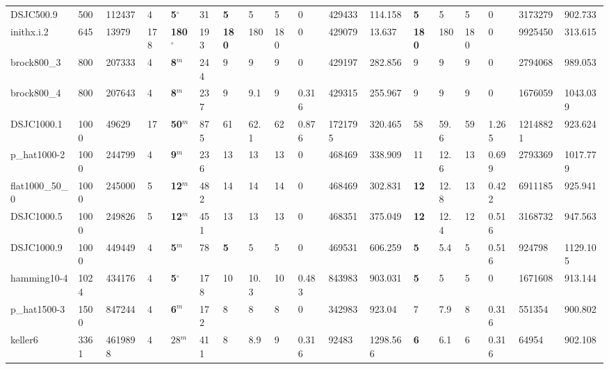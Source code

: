 \begin{table}[h!]
{\begin{tabular}{llllllllllllllllll}
            DSJC500.9 & 500 & 112437 & 4 & \textbf{5}$^{\circ}$ & 31 & \textbf{5} & 5 & 5 & 0 & 429433 & 114.158 & \textbf{5} & 5 & 5 & 0 & 3173279 & 902.733 \\
            inithx.i.2 & 645 & 13979 & 178 & \textbf{180}$^{\circ}$ & 193 & \textbf{180} & 180 & 180 & 0 & 429079 & 13.637 & \textbf{180} & 180 & 180 & 0 & 9925450 & 313.615 \\
            brock800\_3 & 800 & 207333 & 4 & \textbf{8}$^{m}$ & 244 & 9 & 9 & 9 & 0 & 429197 & 282.856 & 9 & 9 & 9 & 0 & 2794068 & 989.053 \\
            brock800\_4 & 800 & 207643 & 4 & \textbf{8}$^{m}$ & 237 & 9 & 9.1 & 9 & 0.316 & 429315 & 255.967 & 9 & 9 & 9 & 0 & 1676059 & 1043.039 \\
            DSJC1000.1 & 1000 & 49629 & 17 & \textbf{50}$^{m}$ & 875 & 61 & 62.1 & 62 & 0.876 & 1721795 & 320.465 & 58 & 59.6 & 59 & 1.265 & 12148821 & 923.624 \\
            p\_hat1000-2 & 1000 & 244799 & 4 & \textbf{9}$^{m}$ & 236 & 13 & 13 & 13 & 0 & 468469 & 338.909 & 11 & 12.6 & 13 & 0.699 & 2793369 & 1017.779 \\
            flat1000\_50\_0 & 1000 & 245000 & 5 & \textbf{12}$^{m}$ & 482 & 14 & 14 & 14 & 0 & 468469 & 302.831 & \textbf{12} & 12.8 & 13 & 0.422 & 6911185 & 925.941 \\
            DSJC1000.5 & 1000 & 249826 & 5 & \textbf{12}$^{m}$ & 451 & 13 & 13 & 13 & 0 & 468351 & 375.049 & \textbf{12} & 12.4 & 12 & 0.516 & 3168732 & 947.563 \\
            DSJC1000.9 & 1000 & 449449 & 4 & \textbf{5}$^{m}$ & 78 & \textbf{5} & 5 & 5 & 0 & 469531 & 606.259 & \textbf{5} & 5.4 & 5 & 0.516 & 924798 & 1129.105 \\
            hamming10-4 & 1024 & 434176 & 4 & \textbf{5}$^{\circ}$ & 178 & 10 & 10.3 & 10 & 0.483 & 843983 & 903.031 & \textbf{5} & 5 & 5 & 0 & 1671608 & 913.144 \\
            p\_hat1500-3 & 1500 & 847244 & 4 & \textbf{6}$^{m}$ & 172 & 8 & 8 & 8 & 0 & 342983 & 923.04 & 7 & 7.9 & 8 & 0.316 & 551354 & 900.802 \\
            keller6 & 3361 & 4619898 & 4 & 28$^{m}$ & 411 & 8 & 8.9 & 9 & 0.316 & 92483 & 1298.566 & \textbf{6} & 6.1 & 6 & 0.316 & 64954 & 902.108 \\
            \bottomrule
        \end{tabular}
    }{
}
\end{table}

